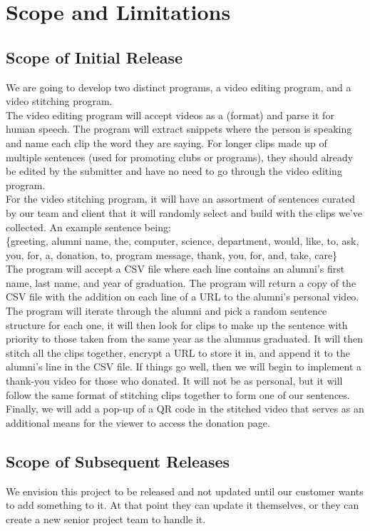 \section{Scope and Limitations}
%
\subsection{Scope of Initial Release}
We are going to develop two distinct programs, 
a video editing program, and a video stitching program.\\ 
The video editing program will accept videos as a (format) 
and parse it for human speech. The program will extract 
snippets where the person is speaking and name each clip 
the word they are saying. For longer clips made up of 
multiple sentences (used for promoting clubs or programs), 
they should already be edited by the submitter and have no 
need to go through the video editing program.\\
For the video stitching program, it will have an assortment of
sentences curated by our team and client that it will randomly
select and build with the clips we've collected. An example
sentence being:\\ 
\{greeting, alumni name, the, computer, science, department, 
would, like, to, ask, you, for, a, donation, to, program message,
thank, you, for, and, take, care\} \\
The program will accept a CSV file where each line contains an
alumni's first name, last name, and year of graduation. 
The program will return a copy of the CSV file with the addition
on each line of a URL to the alumni's personal video. The program
will iterate through the alumni and pick a random sentence
structure for each one, it will then look for clips to make up
the sentence with priority to those taken from the same year 
as the alumnus graduated. It will then stitch all the clips
together, encrypt a URL to store it in, and append it to 
the alumni's line in the CSV file.
If things go well, then we will begin to implement a thank-you 
video for those who donated. It will not be as personal, but 
it will follow the same format of stitching clips together to 
form one of our sentences. Finally, we will add a pop-up of a QR
code in the stitched video that serves as an additional means
for the viewer to access the donation page.
\subsection{Scope of Subsequent Releases}
We envision this project to be released and not updated until our
customer wants to add something to it. At that point they can 
update it themselves, or they can create a new senior project 
team to handle it.
